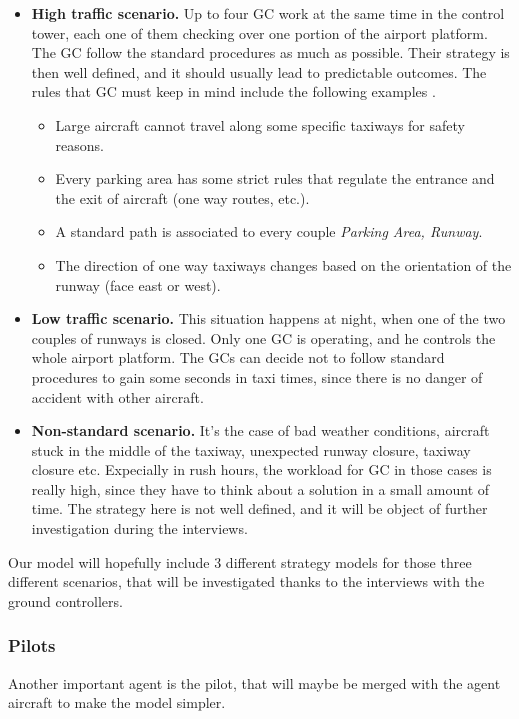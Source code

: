 \documentclass{article}
\begin{document}
\begin{itemize}
	\item \textbf{High traffic scenario.} Up to four GC work at the same time in the control tower, each one of them checking over one portion of the airport platform. The GC follow the standard procedures as much as possible. Their strategy is then well defined, and it should usually lead to predictable outcomes. 
	The rules that GC must keep in mind include the following examples \cite{livret}.
	\begin{itemize}
		\item Large aircraft cannot travel along some specific taxiways for safety reasons.
		\item Every parking area has some strict rules that regulate the entrance and the exit of aircraft (one way routes, etc.).
		\item A standard path is associated to every couple \textit{Parking Area, Runway}.
		\item The direction of one way taxiways changes based on the orientation of the runway (face east or west).
	\end{itemize}
	\item \textbf{Low traffic scenario.} This situation happens at night, when one of the two couples of runways is closed. Only one GC is operating, and he controls the whole airport platform. The GCs can decide not to follow standard procedures to gain some seconds in taxi times, since there is no danger of accident with other aircraft.
	\item \textbf{Non-standard scenario.} It's the case of bad weather conditions, aircraft stuck in the middle of the taxiway, unexpected runway closure, taxiway closure etc. Expecially in rush hours, the workload for GC in those cases is really high, since they have to think about a solution in a small amount of time. The strategy here is not well defined, and it will be object of further investigation during the interviews.
\end{itemize}

Our model will hopefully include 3 different strategy models for those three different scenarios, that will be investigated thanks to the interviews with the ground controllers.


\subsubsection{Pilots}

Another important agent is the pilot, that will maybe be merged with the agent aircraft to make the model simpler. 
\end{document}

